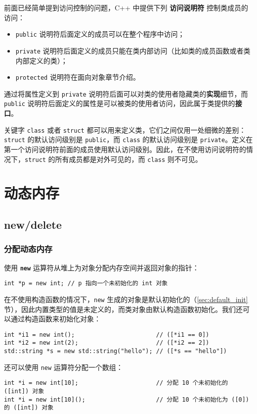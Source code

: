 \documentclass[hyperref,UTF8]{article}
\begin{document}
前面已经简单提到访问控制的问题，C++ 中提供下列 \textbf{访问说明符} 控制类成员的访问：

\begin{itemize}
  \item \texttt{public} 说明符后面定义的成员可以在整个程序中访问；
  \item \texttt{private} 说明符后面定义的成员只能在类内部访问（比如类的成员函数或者类内部定义的类）；
  \item \texttt{protected} 说明符在面向对象章节介绍。
\end{itemize}

通过将属性定义到 \texttt{private} 说明符后面可以对类的使用者隐藏类的\textbf{实现}细节，而 \texttt{public} 说明符后面定义的属性是可以被类的使用者访问，因此属于类提供的\textbf{接口}。

关键字 \texttt{class} 或者 \texttt{struct} 都可以用来定义类，它们之间仅用一处细微的差别：\texttt{struct} 的默认访问级别是 \texttt{public}，而 \texttt{class} 的默认访问级别是 \texttt{private}。定义在第一个访问说明符前面的成员使用默认访问级别。因此，在不使用访问说明符的情况下，\texttt{struct} 的所有成员都是对外可见的，而 \texttt{class} 则不可见。

\section{动态内存}

\subsection{new/delete}

\subsubsection{分配动态内存}

使用 \textbf{\texttt{new}} 运算符从堆上为对象分配内存空间并返回对象的指针：
\begin{lstlisting}[numbers=none]
int *p = new int; // p 指向一个未初始化的 int 对象
\end{lstlisting}
在不使用构造函数的情况下，\texttt{new} 生成的对象是默认初始化的（\ref{sec:default_init} 节），因此内置类型的值是未定义的，而类对象由默认构造函数初始化。我们还可以通过构造函数来初始化对象：
\begin{lstlisting}
int *i1 = new int();                       // ([*i1 == 0])
int *i2 = new int(2);                      // ([*i2 == 2])
std::string *s = new std::string("hello"); // ([*s == "hello"])
\end{lstlisting}
还可以使用 \texttt{new} 运算符分配一个数组：
\begin{lstlisting}
int *i = new int[10];                      // 分配 10 个未初始化的 ([int]) 对象
int *i = new int[10]();                    // 分配 10 个未初始化为 ([0]) 的 ([int]) 对象
\end{lstlisting}
\end{document}
